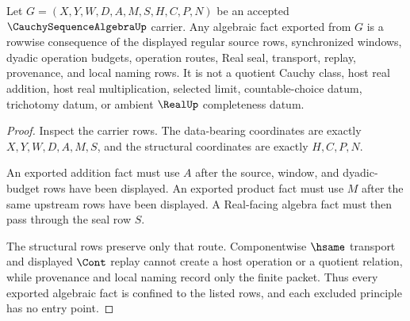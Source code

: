 \begin{theorem}
\label{thm:cauchy-sequence-algebra-route-nonescape}
Let $G=(X,Y,W,D,A,M,S,H,C,P,N)$ be an accepted $\CauchySequenceAlgebraUp$ carrier. Any algebraic fact exported from $G$ is a rowwise consequence of the displayed regular source rows, synchronized windows, dyadic operation budgets, operation routes, Real seal, transport, replay, provenance, and local naming rows. It is not a quotient Cauchy class, host real addition, host real multiplication, selected limit, countable-choice datum, trichotomy datum, or ambient $\RealUp$ completeness datum.
\end{theorem}
\begin{proof}
Inspect the carrier rows. The data-bearing coordinates are exactly $X,Y,W,D,A,M,S$, and the structural coordinates are exactly $H,C,P,N$.

An exported addition fact must use $A$ after the source, window, and dyadic-budget rows have been displayed. An exported product fact must use $M$ after the same upstream rows have been displayed. A Real-facing algebra fact must then pass through the seal row $S$.

The structural rows preserve only that route. Componentwise $\hsame$ transport and displayed $\Cont$ replay cannot create a host operation or a quotient relation, while provenance and local naming record only the finite packet. Thus every exported algebraic fact is confined to the listed rows, and each excluded principle has no entry point.
\end{proof}

